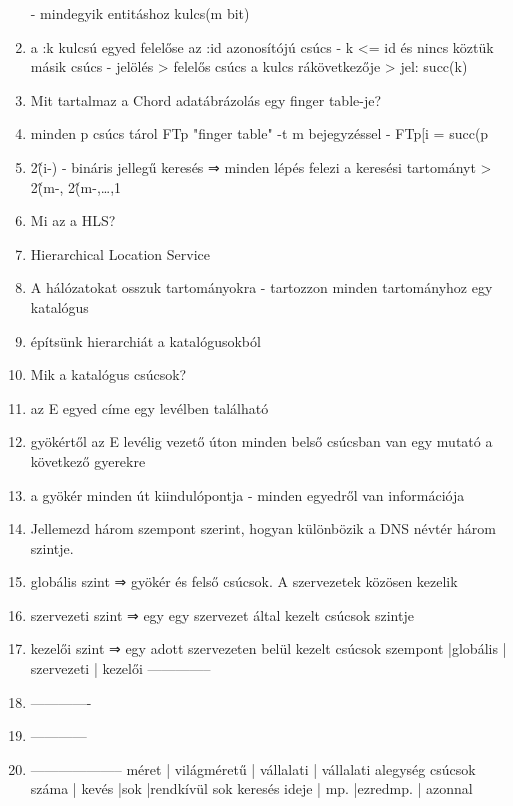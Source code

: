 \documentclass[twoside, a4paper, 12pt]{article}
\begin{document}
\begin{enumerate}
                - mindegyik entitáshoz kulcs(m bit)
            \item a :k kulcsú egyed felelőse az :id azonosítójú csúcs
                - k <= id és nincs köztük másik csúcs
                - jelölés
                > felelős csúcs a kulcs rákövetkezője
                > jel: succ(k)
            \item  Mit tartalmaz a Chord adatábrázolás egy finger table-je?
            \item minden p csúcs tárol FTp "finger table" -t m bejegyzéssel
                - FTp[i = succ(p\item2\^(i-)
                - bináris jellegű keresés ⇒ minden lépés felezi a keresési tartományt
                > 2\^(m-, 2\^(m-,\ldots,1
            \item  Mi az a HLS?
            \item Hierarchical Location Service
            \item A hálózatokat osszuk tartományokra
                - tartozzon minden tartományhoz egy katalógus
            \item építsünk hierarchiát a katalógusokból
            \item  Mik a katalógus csúcsok?
            \item az E egyed címe egy levélben található
            \item gyökértől az E levélig vezető úton minden belső csúcsban van egy mutató a következő gyerekre
            \item a gyökér minden út kiindulópontja
                - minden egyedről van információja
            \item  Jellemezd három szempont szerint, hogyan különbözik a DNS névtér három szintje.
            \item globális szint   ⇒ gyökér és felső csúcsok. A szervezetek közösen kezelik
            \item szervezeti szint ⇒ egy egy szervezet által kezelt csúcsok szintje
            \item kezelői szint    ⇒ egy adott szervezeten belül kezelt csúcsok
                szempont      |globális     | szervezeti | kezelői
                --------------\item-------------\item------------\item--------------------
                méret         | világméretű | vállalati  | vállalati alegység
                csúcsok száma | kevés       |sok         |rendkívül sok
                keresés ideje | mp.         |ezredmp.    | azonnal

\end{enumerate}
\end{document}
